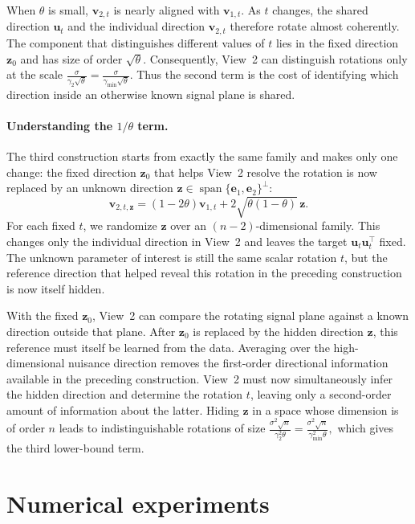 \documentclass[11pt]{article}
\newcommand{\trans}{\top}
\begin{document}
When $\theta$ is small, $\bm v_{2,t}$ is nearly aligned with
$\bm v_{1,t}$. As $t$ changes, the shared direction $\bm u_t$ and
the individual direction $\bm v_{2,t}$ therefore rotate almost coherently.
The component that distinguishes different values of $t$ lies in the fixed
direction $\bm z_0$ and has size of order $\sqrt{\theta}$. Consequently,
View~2 can distinguish rotations only at the scale
$\frac{\sigma}{\gamma_2\sqrt\theta}
  =
  \frac{\sigma}{\gamma_{\min}\sqrt\theta}$. 
Thus the second term is the cost of identifying which direction inside an
otherwise known signal plane is shared.

\paragraph{Understanding the $1/\theta$ term.}
The third construction starts from exactly the same family and makes only one
change: the fixed direction $\bm z_0$ that helps View~2 resolve the rotation is
now replaced by an unknown direction
$\bm z\in\operatorname{span}\{\bm e_1,\bm e_2\}^{\perp}$:
\[
  \bm v_{2,t,\bm z}
  =
  (1-2\theta)\bm v_{1,t}
  +
  2\sqrt{\theta(1-\theta)}\,\bm z.
\]
For each fixed $t$, we randomize $\bm z$ over an $(n-2)$-dimensional family.
This changes only the individual direction in View~2 and leaves the target
$\bm u_t \bm u_t^\trans$ fixed. The unknown parameter of interest is still the
same scalar rotation $t$, but the reference direction that helped reveal
this rotation in the preceding construction is now itself hidden.

With the fixed $\bm z_0$, View~2 can compare the rotating signal plane against a
known direction outside that plane. After $\bm z_0$ is replaced by the hidden
direction $\bm z$, this reference must itself be learned from the data.
Averaging over the high-dimensional nuisance direction removes the
first-order directional information available in the preceding construction.
View~2 must now simultaneously infer the hidden direction and determine the
rotation $t$, leaving only a second-order amount of information about the
latter.  Hiding $\bm z$ in a space   whose dimension is of order $n$ leads to
indistinguishable rotations of size
$  \frac{\sigma^2\sqrt n}
       {\gamma_2^2\theta}
  =
  \frac{\sigma^2\sqrt n}
       {\gamma_{\min}^2\theta},$ which gives the third lower-bound term.

\section{Numerical experiments}
\label{sec:numerical-experiments}
\end{document}
